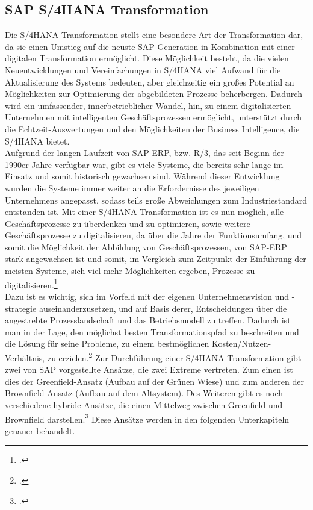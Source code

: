 \subsection{SAP S/4HANA Transformation}
\label{kap:s4hanatrans}
Die S/4HANA Transformation stellt eine besondere Art der Transformation dar, da sie einen Umstieg auf die neuste SAP Generation in Kombination mit einer digitalen Transformation ermöglicht. Diese Möglichkeit besteht, da die vielen Neuentwicklungen und Vereinfachungen in S/4HANA viel Aufwand für die Aktualisierung des Systems bedeuten, aber gleichzeitig ein großes Potential an Möglichkeiten zur Optimierung der abgebildeten Prozesse beherbergen. Dadurch wird ein umfassender, innerbetrieblicher Wandel, hin, zu einem digitalisierten Unternehmen mit intelligenten Geschäftsprozessen ermöglicht, unterstützt durch die Echtzeit-Auswertungen und den Möglichkeiten der Business Intelligence, die S/4HANA bietet.
\\Aufgrund der langen Laufzeit von SAP-ERP, bzw. R/3, das seit Beginn der 1990er-Jahre verfügbar war, gibt es viele Systeme, die bereits sehr lange im Einsatz und somit historisch gewachsen sind. Während dieser Entwicklung wurden die Systeme immer weiter an die Erfordernisse des jeweiligen Unternehmens angepasst, sodass teils große Abweichungen zum Industriestandard entstanden ist. Mit einer S/4HANA-Transformation ist es nun möglich, alle Geschäftsprozesse zu überdenken und zu optimieren, sowie weitere Geschäftsprozesse zu digitalisieren, da über die Jahre der Funktionsumfang, und somit die Möglichkeit der Abbildung von Geschäftsprozessen, von SAP-ERP stark angewachsen ist und somit, im Vergleich zum Zeitpunkt der Einführung der meisten Systeme, sich viel mehr Möglichkeiten ergeben, Prozesse zu digitalisieren.\footcite[Vgl.][]{s4-interview}
\\Dazu ist es wichtig, sich im Vorfeld mit der eigenen Unternehmensvision und -strategie auseinanderzusetzen, und auf Basis derer, Entscheidungen über die angestrebte Prozesslandschaft und das Betriebsmodell zu treffen. Dadurch ist man in der Lage, den möglichst besten Transformationspfad zu beschreiten und die Lösung für seine Probleme, zu einem bestmöglichen Kosten/Nutzen-Verhältnis, zu erzielen.\footcite[Vgl.][]{ao-blog}
Zur Durchführung einer S/4HANA-Transformation gibt zwei von SAP vorgestellte Ansätze, die zwei Extreme vertreten. Zum einen ist dies der Greenfield-Ansatz (Aufbau auf der \glqq{}Grünen Wiese\grqq{}) und zum anderen der Brownfield-Ansatz (Aufbau auf dem Altsystem). Des Weiteren gibt es noch verschiedene hybride Ansätze, die einen Mittelweg zwischen Greenfield und Brownfield darstellen.\footcite[Vgl.][]{ao-blog} Diese Ansätze werden in den folgenden Unterkapiteln genauer behandelt.
